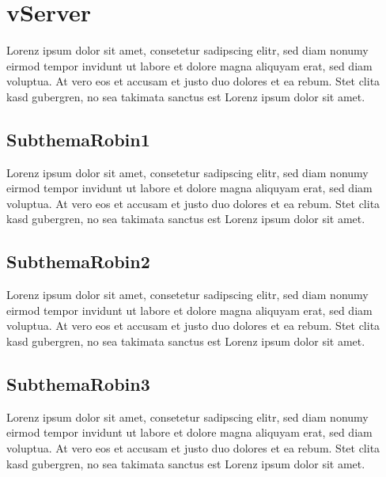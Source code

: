 \section{vServer}\label{subsec:vserver}

Lorenz ipsum dolor sit amet, consetetur sadipscing elitr, sed diam nonumy eirmod tempor invidunt ut labore et dolore magna aliquyam erat, sed diam voluptua.
At vero eos et accusam et justo duo dolores et ea rebum.
Stet clita kasd gubergren, no sea takimata sanctus est Lorenz ipsum dolor sit amet.

\subsection{SubthemaRobin1}\label{subsubsec:robin1}

Lorenz ipsum dolor sit amet, consetetur sadipscing elitr, sed diam nonumy eirmod tempor invidunt ut labore et dolore magna aliquyam erat, sed diam voluptua.
At vero eos et accusam et justo duo dolores et ea rebum.
Stet clita kasd gubergren, no sea takimata sanctus est Lorenz ipsum dolor sit amet.

\subsection{SubthemaRobin2}\label{subsubsec:robin2}

Lorenz ipsum dolor sit amet, consetetur sadipscing elitr, sed diam nonumy eirmod tempor invidunt ut labore et dolore magna aliquyam erat, sed diam voluptua.
At vero eos et accusam et justo duo dolores et ea rebum.
Stet clita kasd gubergren, no sea takimata sanctus est Lorenz ipsum dolor sit amet.

\subsection{SubthemaRobin3}\label{subsubsec:robin3}

Lorenz ipsum dolor sit amet, consetetur sadipscing elitr, sed diam nonumy eirmod tempor invidunt ut labore et dolore magna aliquyam erat, sed diam voluptua.
At vero eos et accusam et justo duo dolores et ea rebum.
Stet clita kasd gubergren, no sea takimata sanctus est Lorenz ipsum dolor sit amet.

